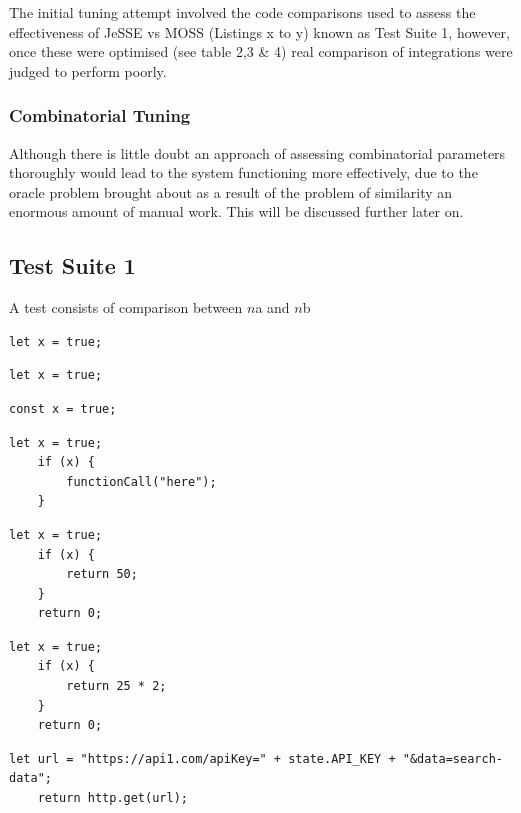 \documentclass[jou,apacite]{apa6}
\begin{document}
The initial tuning attempt involved the code comparisons used to assess the effectiveness of JeSSE vs MOSS (Listings x to y) known as Test Suite 1, however, once these were optimised (see table 2,3 \& 4) real comparison of integrations were judged to perform poorly.

\subsubsection{Combinatorial Tuning}
Although there is little doubt an approach of assessing combinatorial parameters thoroughly  would lead to the system functioning more effectively, due to the oracle problem brought about as a result of the problem of similarity an enormous amount of manual work. This will be discussed further later on.

\subsection{Test Suite 1}
A test consists of comparison between $n$a and $n$b
\begin{lstlisting}[caption=Comparison 1a \& 1b - Identical]
	let x = true;
\end{lstlisting}

\begin{lstlisting}[caption=Comparison 2a - Let against const]
	let x = true;
\end{lstlisting}
\begin{lstlisting}[caption=Comparison 2b - Let against const]
	const x = true;
\end{lstlisting}

\begin{lstlisting}[caption=Comparison 3a \& 3b - Identical extended]
	let x = true;
	if (x) {
		functionCall("here");
	}
\end{lstlisting}

\begin{lstlisting}[caption=Comparison 4a - Effect of numeric literal vs numberic expression]
	let x = true;
	if (x) {
		return 50;
	}
	return 0;
\end{lstlisting}

\begin{lstlisting}[caption=Comparison 4b - Effect of numeric literal vs numberic expression]
	let x = true;
	if (x) {
		return 25 * 2;
	}
	return 0;
\end{lstlisting}

\begin{lstlisting}[caption=Comparison 5a - Similar functions with literal and identifier name changes]
	let url = "https://api1.com/apiKey=" + state.API_KEY + "&data=search-data";
	return http.get(url);
\end{lstlisting}
\end{document}
